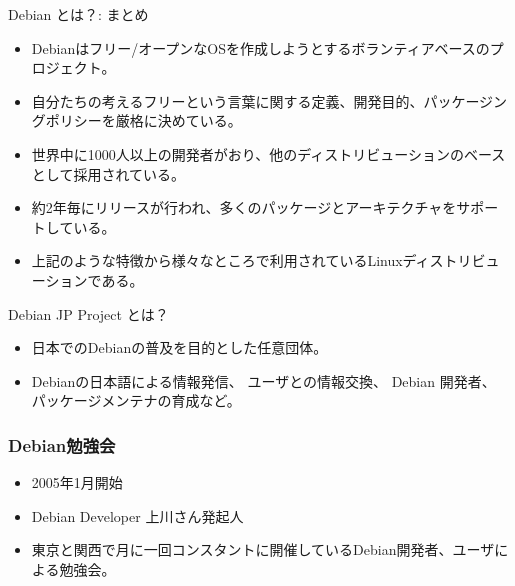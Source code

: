 \documentclass[cjk,c,squeeze,shrink,dvipdfmx,12pt]{beamer}
\begin{document}
\begin{frame}[fragile]{Debian とは？: まとめ}
  \pause
  \begin{itemize}[<+->]
  \item Debianはフリー/オープンなOSを作成しようとするボランティアベースのプロジェクト。
  \item 自分たちの考えるフリーという言葉に関する定義、開発目的、パッケージングポリシーを厳格に決めている。
  \item 世界中に1000人以上の開発者がおり、他のディストリビューションのベースとして採用されている。
  \item 約2年毎にリリースが行われ、多くのパッケージとアーキテクチャをサポートしている。  \item 上記のような特徴から様々なところで利用されているLinuxディストリビューションである。
\end{itemize}
\end{frame}

\iffalse
\begin{frame}[fragile]{Debian JP Project とは？}
  \pause
  \begin{itemize}[<+->]
  \item 日本でのDebianの普及を目的とした任意団体。
  \item %
    Debianの日本語による情報発信、
    ユーザとの情報交換、
    Debian 開発者、
    パッケージメンテナの育成など。
  \end{itemize}
\end{frame}


\begin{frame}
  \frametitle{Debian勉強会}
  \begin{itemize}
  \item 2005年1月開始
  \item Debian Developer 上川さん発起人
  \item 東京と関西で月に一回コンスタントに開催しているDebian開発者、ユーザによる勉強会。
  \end{itemize}
\end{frame}
\end{document}
